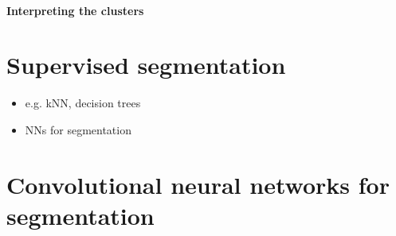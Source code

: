 \documentclass[letterpaper,10pt,english]{sphinxmanual}
\begin{document}
\noindent{}


\subsubsection{Interpreting the clusters}
\label{\detokenize{ML4NeutronImageSegmentation:interpreting-the-clusters}}
\begin{sphinxVerbatim}[commandchars=\\\{\}]
   
\PYG{p}{[}\PYG{p}{]}
\PYG{p}{[}\PYG{p}{]} \PYG{p}{[}\PYG{p}{]} \PYG{p}{[}\PYG{p}{]}\PYG{p}{[}\PYG{p}{]} 
\end{sphinxVerbatim}

\noindent{}


\chapter{Supervised segmentation}
\label{\detokenize{ML4NeutronImageSegmentation:supervised-segmentation}}\begin{itemize}
\item {} 
e.g. k\sphinxhyphen{}NN, decision trees

\item {} 
NNs for segmentation

\end{itemize}


\chapter{Convolutional neural networks for segmentation}
\label{\detokenize{ML4NeutronImageSegmentation:convolutional-neural-networks-for-segmentation}}
\end{document}
